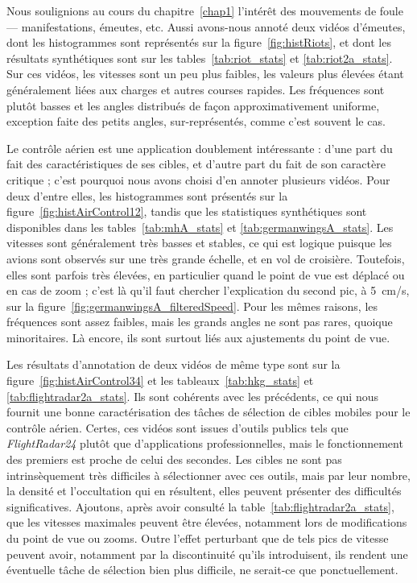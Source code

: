 
	Nous soulignions au cours du chapitre~\ref{chap1} l'intérêt des mouvements de foule --- manifestations, émeutes, etc. Aussi avons-nous annoté deux vidéos d'émeutes, dont les histogrammes sont représentés sur la figure~\ref{fig:histRiots}, et dont les résultats synthétiques sont sur les tables~\ref{tab:riot_stats} et \ref{tab:riot2a_stats}. Sur ces vidéos, les vitesses sont un peu plus faibles, les valeurs plus élevées étant généralement liées aux charges et autres courses rapides. Les fréquences sont plutôt basses et les angles distribués de façon approximativement uniforme, exception faite des petits angles, sur-représentés, comme c'est souvent le cas.

	Le contrôle aérien est une application doublement intéressante : d'une part du fait des caractéristiques de ses cibles, et d'autre part du fait de son caractère critique ; c'est pourquoi nous avons choisi d'en annoter plusieurs vidéos. Pour deux d'entre elles, les histogrammes sont présentés sur la figure~\ref{fig:histAirControl12}, tandis que les statistiques synthétiques sont disponibles dans les tables~\ref{tab:mhA_stats} et \ref{tab:germanwingsA_stats}. Les vitesses sont généralement très basses et stables, ce qui est logique puisque les avions sont observés sur une très grande échelle, et en vol de croisière. Toutefois, elles sont parfois très élevées, en particulier quand le point de vue est déplacé ou en cas de zoom ; c'est là qu'il faut chercher l'explication du second pic, à 5~cm/s, sur la figure~\ref{fig:germanwingsA_filteredSpeed}. Pour les mêmes raisons, les fréquences sont assez faibles, mais les grands angles ne sont pas rares, quoique minoritaires. Là encore, ils sont surtout liés aux ajustements du point de vue.	

	Les résultats d'annotation de deux vidéos de même type sont sur la figure~\ref{fig:histAirControl34} et les tableaux~\ref{tab:hkg_stats} et \ref{tab:flightradar2a_stats}. Ils sont cohérents avec les précédents, ce qui nous fournit une bonne caractérisation des tâches de sélection de cibles mobiles pour le contrôle aérien. Certes, ces vidéos sont issues d'outils publics tels que \emph{FlightRadar24} plutôt que d'applications professionnelles, mais le fonctionnement des premiers est proche de celui des secondes. Les cibles ne sont pas intrinsèquement très difficiles à sélectionner avec ces outils, mais par leur nombre, la densité et l'occultation qui en résultent, elles peuvent présenter des difficultés significatives. Ajoutons, après avoir consulté la table~\ref{tab:flightradar2a_stats}, que les vitesses maximales peuvent être élevées, notamment lors de modifications du point de vue ou zooms. Outre l'effet perturbant que de tels pics de vitesse peuvent avoir, notamment par la discontinuité qu'ils introduisent, ils rendent une éventuelle tâche de sélection bien plus difficile, ne serait-ce que ponctuellement.
	
